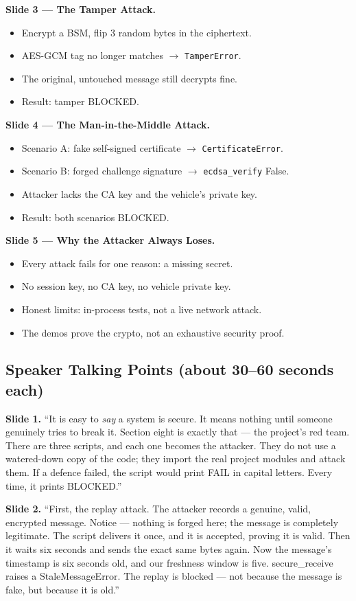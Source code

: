 \documentclass[11pt,a4paper]{article}
\begin{document}
\textbf{Slide 3 --- The Tamper Attack.}
\begin{itemize}
  \item Encrypt a BSM, flip 3 random bytes in the ciphertext.
  \item AES-GCM tag no longer matches $\to$ \texttt{TamperError}.
  \item The original, untouched message still decrypts fine.
  \item Result: tamper BLOCKED.
\end{itemize}

\textbf{Slide 4 --- The Man-in-the-Middle Attack.}
\begin{itemize}
  \item Scenario A: fake self-signed certificate $\to$ \texttt{CertificateError}.
  \item Scenario B: forged challenge signature $\to$ \texttt{ecdsa\_verify} False.
  \item Attacker lacks the CA key and the vehicle's private key.
  \item Result: both scenarios BLOCKED.
\end{itemize}

\textbf{Slide 5 --- Why the Attacker Always Loses.}
\begin{itemize}
  \item Every attack fails for one reason: a missing secret.
  \item No session key, no CA key, no vehicle private key.
  \item Honest limits: in-process tests, not a live network attack.
  \item The demos prove the crypto, not an exhaustive security proof.
\end{itemize}

\subsection{Speaker Talking Points (about 30--60 seconds each)}

\textbf{Slide 1.} ``It is easy to \emph{say} a system is secure. It means nothing
until someone genuinely tries to break it. Section eight is exactly that --- the
project's red team. There are three scripts, and each one becomes the attacker.
They do not use a watered-down copy of the code; they import the real project
modules and attack them. If a defence failed, the script would print FAIL in
capital letters. Every time, it prints BLOCKED.''

\textbf{Slide 2.} ``First, the replay attack. The attacker records a genuine,
valid, encrypted message. Notice --- nothing is forged here; the message is
completely legitimate. The script delivers it once, and it is accepted, proving
it is valid. Then it waits six seconds and sends the exact same bytes again. Now
the message's timestamp is six seconds old, and our freshness window is five.
secure\_receive raises a StaleMessageError. The replay is blocked --- not because
the message is fake, but because it is old.''
\end{document}
